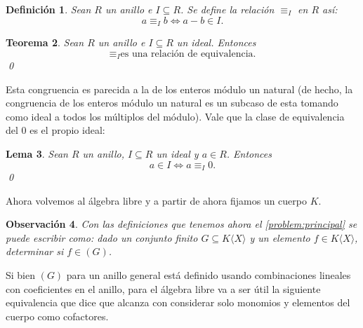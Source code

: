 \documentclass[12pt]{report}
\theoremstyle{customstyle}
\newtheorem{theorem}{Teorema}[chapter]
\newtheorem{definition}[theorem]{Definición}
\newtheorem{lemma}[theorem]{Lema}
\newtheorem{observation}[theorem]{Observación}
\theoremstyle{factstyle}
\begin{document}
\begin{definition}\label{def:congruencia mod ideal}
  Sean $R$ un anillo e $I ⊆ R$. Se define la relación $≡_I$ en $R$ así:
  \[ a ≡_I b ⇔ a - b ∈ I \text{.}\]
\end{definition}

\begin{theorem}\label{thm:congruencia mod ideal es equivalencia}
  Sean $R$ un anillo e $I ⊆ R$ un ideal. Entonces
  \[ ≡_I \text{es una relación de equivalencia} \text{.}\]
  \qed
\end{theorem}

Esta congruencia es parecida a la de los enteros módulo un natural (de hecho, la congruencia de los enteros módulo un natural es un subcaso de esta tomando como ideal a todos los múltiplos del módulo). Vale que la clase de equivalencia del $0$ es el propio ideal:

\begin{lemma}\label{lemma:en ideal ⇔ congruente 0}
  Sean $R$ un anillo, $I ⊆ R$ un ideal y $a ∈ R$. Entonces
  \[ a ∈ I ⇔ a ≡_I 0 \text{.}\]
  \qed
\end{lemma}

Ahora volvemos al álgebra libre y a partir de ahora fijamos un cuerpo $K$.

\begin{observation}
  Con las definiciones que tenemos ahora el \cref{problem:principal} se puede escribir como: dado un conjunto finito $G ⊆ K⟨X⟩$ y un elemento $f ∈ K⟨X⟩$, determinar si $f ∈ (G)$.
\end{observation}

Si bien $(G)$ para un anillo general está definido usando combinaciones lineales con coeficientes en el anillo, para el álgebra libre va a ser útil la siguiente equivalencia que dice que alcanza con considerar solo monomios y elementos del cuerpo como cofactores.
\end{document}
